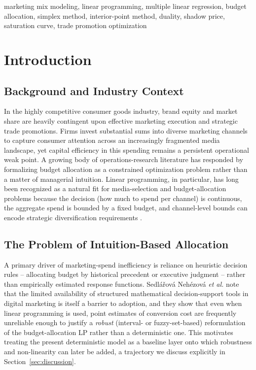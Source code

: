 \documentclass[conference]{IEEEtran}
\begin{document}
\begin{IEEEkeywords}
marketing mix modeling, linear programming, multiple linear regression, budget allocation, simplex method, interior-point method, duality, shadow price, saturation curve, trade promotion optimization
\end{IEEEkeywords}

\section{Introduction}

\subsection{Background and Industry Context}
In the highly competitive consumer goods industry, brand equity and market share are heavily contingent upon effective marketing execution and strategic trade promotions. Firms invest substantial sums into diverse marketing channels to capture consumer attention across an increasingly fragmented media landscape, yet capital efficiency in this spending remains a persistent operational weak point. A growing body of operations-research literature has responded by formalizing budget allocation as a constrained optimization problem rather than a matter of managerial intuition. Linear programming, in particular, has long been recognized as a natural fit for media-selection and budget-allocation problems because the decision (how much to spend per channel) is continuous, the aggregate spend is bounded by a fixed budget, and channel-level bounds can encode strategic diversification requirements \cite{study_lp_media}.

\subsection{The Problem of Intuition-Based Allocation}
A primary driver of marketing-spend inefficiency is reliance on heuristic decision rules -- allocating budget by historical precedent or executive judgment -- rather than empirically estimated response functions. Sedl\'a\v{r}ov\'a Neh\'ezov\'a \emph{et al.} \cite{robust_lp_2025} note that the limited availability of structured mathematical decision-support tools in digital marketing is itself a barrier to adoption, and they show that even when linear programming is used, point estimates of conversion cost are frequently unreliable enough to justify a \emph{robust} (interval- or fuzzy-set-based) reformulation of the budget-allocation LP rather than a deterministic one. This motivates treating the present deterministic model as a baseline layer onto which robustness and non-linearity can later be added, a trajectory we discuss explicitly in Section~\ref{sec:discussion}.
\end{document}
